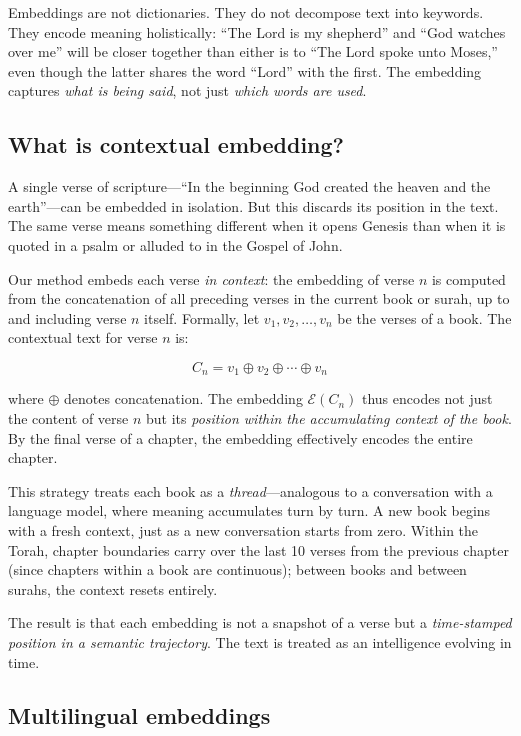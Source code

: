 \documentclass[11pt,a4paper]{article}
\theoremstyle{definition}
\begin{document}
Embeddings are not dictionaries. They do not decompose text into keywords. They encode meaning holistically: ``The Lord is my shepherd'' and ``God watches over me'' will be closer together than either is to ``The Lord spoke unto Moses,'' even though the latter shares the word ``Lord'' with the first. The embedding captures \emph{what is being said}, not just \emph{which words are used}.

\subsection{What is contextual embedding?}

A single verse of scripture---``In the beginning God created the heaven and the earth''---can be embedded in isolation. But this discards its position in the text. The same verse means something different when it opens Genesis than when it is quoted in a psalm or alluded to in the Gospel of John.

Our method embeds each verse \emph{in context}: the embedding of verse $n$ is computed from the concatenation of all preceding verses in the current book or surah, up to and including verse $n$ itself. Formally, let $v_1, v_2, \ldots, v_n$ be the verses of a book. The contextual text for verse $n$ is:

\[
C_n = v_1 \oplus v_2 \oplus \cdots \oplus v_n
\]

\noindent where $\oplus$ denotes concatenation. The embedding $\mathcal{E}(C_n)$ thus encodes not just the content of verse $n$ but its \emph{position within the accumulating context of the book}. By the final verse of a chapter, the embedding effectively encodes the entire chapter.

This strategy treats each book as a \emph{thread}---analogous to a conversation with a language model, where meaning accumulates turn by turn. A new book begins with a fresh context, just as a new conversation starts from zero. Within the Torah, chapter boundaries carry over the last 10 verses from the previous chapter (since chapters within a book are continuous); between books and between surahs, the context resets entirely.

The result is that each embedding is not a snapshot of a verse but a \emph{time-stamped position in a semantic trajectory}. The text is treated as an intelligence evolving in time.

\subsection{Multilingual embeddings}
\end{document}
